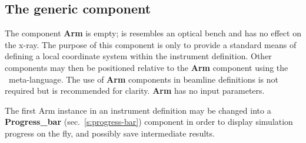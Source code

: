\subsection*{The generic component}
\label{s:arm}

The component \textbf{Arm} is empty; is resembles an optical bench
and has no effect on the x-ray.
The purpose of this component is only to provide a standard
means of defining a local coordinate system within the instrument definition.
Other components may then be
positioned relative to the \textbf{Arm} component
using the \MCX\ meta-language.
The use of \textbf{Arm} components in beamline definitions
is not required but is recommended for clarity.
\textbf{Arm} has no input parameters.

The first Arm instance in an instrument definition may be changed into a
\textbf{Progress\_bar} (sec.~\ref{s:progress-bar}) component in order to display
simulation progress on the fly, and possibly save intermediate results.
